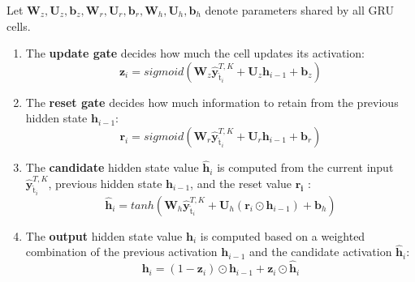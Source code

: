 \documentclass[letterpaper,12pt,titlepage,oneside,final]{book}
\numberwithin{equation}{section}
\theoremstyle{definition}
\newcommand{\vb}{\mathbf{b}}
\newcommand{\vy}{\mathbf{y}}
\newcommand{\vh}{\mathbf{h}}
\newcommand{\vW}{\pmb{W}}
\newcommand{\vU}{\pmb{U}}
\newcommand{\nt}{\breve{\text{t}}}
\begin{document}
Let  $\vW_z,\vU_z,\vb_z,\vW_r,\vU_r, \vb_r,\vW_h,\vU_h,\vb_h$  denote
parameters shared by all GRU cells.


\begin{enumerate}
	\item The \textbf{update gate} decides how much the cell updates its activation:
	\[\mathbf{z}_i= sigmoid ( \vW_z \widehat{\vy}^{T,K}_{\nt_{i}} + \vU_z \vh_{i-1} +\vb_z)\]
	\item The \textbf{reset gate} decides how much  information to retain from the  previous hidden state $\vh_{i-1}$:
	\[\mathbf{r}_i= sigmoid ( \vW_r \widehat{\vy}^{T,K}_{\nt_{i}} + \vU_r \vh_{i-1} +\vb_r)\]
	\item The \textbf{candidate} hidden state value $\widehat{\vh}_i$ is computed from the current input $\widehat{\vy}^{T,K}_{\nt_{i}}$,  previous hidden state $\vh_{i-1}$, and the reset value $\mathbf{r_i}$ :
	\[
	\widehat{\vh}_i=tanh( \vW_h \widehat{\vy}^{T,K}_{\nt_{i}}  + \vU_h (\mathbf{r}_i \odot \vh_{i-1}) +\vb_h)
	\]
	\item  The \textbf{output} hidden state value $\vh_{i}$ is  computed based on a weighted combination of the previous activation $\vh_{i-1}$ and the candidate activation $\widehat{\vh}_i$:
	\[
	\vh_i=(1-\mathbf{z}_i) \odot \vh_{i-1} + \mathbf{z}_i \odot \widehat{\vh}_i
	\]
\end{enumerate}
\end{document}
